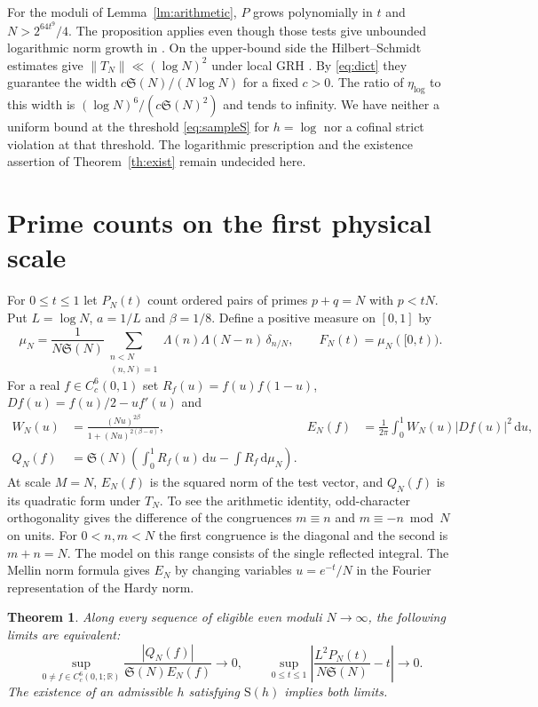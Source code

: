 \documentclass[11pt,a4paper]{article}
\newtheorem{theorem}{Theorem}[section]
\newcommand{\SSg}{\mathfrak S}
\newcommand{\dd}{\,\mathrm d}
\begin{document}
For the moduli of Lemma~\ref{lm:arithmetic}, $P$ grows polynomially in $t$ and $N>2^{64t^9}/4$. The proposition applies even though those tests give unbounded logarithmic norm growth in \cite{Rpaper}. On the upper-bound side the Hilbert--Schmidt estimates give $\|T_N\|\ll(\log N)^2$ under local GRH \cite[Theorem 6.2]{LL}. By \eqref{eq:dict} they guarantee the width $c\SSg(N)/(N\log N)$ for a fixed $c>0$. The ratio of $\eta_{\log}$ to this width is $(\log N)^6/(c\SSg(N)^2)$ and tends to infinity. We have neither a uniform bound at the threshold \eqref{eq:sampleS} for $h=\log$ nor a cofinal strict violation at that threshold. The logarithmic prescription and the existence assertion of Theorem~\ref{th:exist} remain undecided here.

\section{Prime counts on the first physical scale}\label{sec:sharp}

For $0\le t\le1$ let $P_N(t)$ count ordered pairs of primes $p+q=N$ with $p<tN$. Put $L=\log N$, $a=1/L$ and $\beta=1/8$. Define a positive measure on $[0,1]$ by
\[
 \mu_N=\frac{1}{N\SSg(N)}
 \sum_{\substack{n<N\\(n,N)=1}}\Lambda(n)\Lambda(N-n)\,\delta_{n/N},
 \qquad F_N(t)=\mu_N([0,t)).
\]
For a real $f\in C_c^6(0,1)$ set $R_f(u)=f(u)f(1-u)$, $Df(u)=f(u)/2-u f'(u)$ and
\begin{align*}
 W_N(u)&=\frac{(Nu)^{2\beta}}{1+(Nu)^{2(\beta-a)}},&
 E_N(f)&=\frac{1}{2\pi}\int_0^1 W_N(u)|Df(u)|^2\dd u,\\
 Q_N(f)&=\SSg(N)\left(\int_0^1 R_f(u)\dd u-\int R_f\dd\mu_N\right).
\end{align*}
At scale $M=N$, $E_N(f)$ is the squared norm of the test vector, and $Q_N(f)$ is its quadratic form under $T_N$. To see the arithmetic identity, odd-character orthogonality gives the difference of the congruences $m\equiv n$ and $m\equiv-n\bmod N$ on units. For $0<n,m<N$ the first congruence is the diagonal and the second is $m+n=N$. The model on this range consists of the single reflected integral. The Mellin norm formula gives $E_N$ by changing variables $u=e^{-t}/N$ in the Fourier representation of the Hardy norm.

\begin{theorem}\label{th:sharp}
Along every sequence of eligible even moduli $N\to\infty$, the following limits are equivalent:
\[
 \sup_{0\ne f\in C_c^6(0,1;\mathbb R)}
 \frac{|Q_N(f)|}{\SSg(N)E_N(f)}\longrightarrow0,
 \qquad
 \sup_{0\le t\le1}\left|\frac{L^2P_N(t)}{N\SSg(N)}-t\right|
 \longrightarrow0.
\]
The existence of an admissible $h$ satisfying $\mathrm S(h)$ implies both limits.
\end{theorem}
\end{document}
